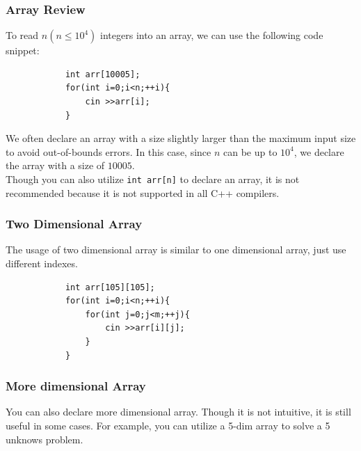 \documentclass[xcolor=dvipsnames]{beamer}
\begin{document}
    \begin{frame}[fragile]
        \frametitle{Array Review}
        To read $n(n\le 10^4)$ integers into an array, we can use the following code snippet:
        \begin{verbatim}
            int arr[10005];
            for(int i=0;i<n;++i){
                cin >>arr[i];
            }
        \end{verbatim}
        We often declare an array with a size slightly larger than the maximum input size to avoid out-of-bounds errors. In this case, since $n$ can be up to $10^4$, we declare the array with a size of $10005$.\\
        Though you can also utilize \texttt{int arr[n]} to declare an array, it is not recommended because it is not supported in all C++ compilers.
    \end{frame}
    \begin{frame}[fragile]
        \frametitle{Two Dimensional Array}
        The usage of two dimensional array is similar to one dimensional array, just use different indexes.
        \begin{verbatim}
            int arr[105][105];
            for(int i=0;i<n;++i){
                for(int j=0;j<m;++j){
                    cin >>arr[i][j];
                }
            }
        \end{verbatim}
    \end{frame}
    \begin{frame}
        \frametitle{More dimensional Array}
        You can also declare more dimensional array. Though it is not intuitive, it is still useful in some cases. For example, you can utilize a 5-dim array to solve a 5 unknows problem.
    \end{frame}
\end{document}
